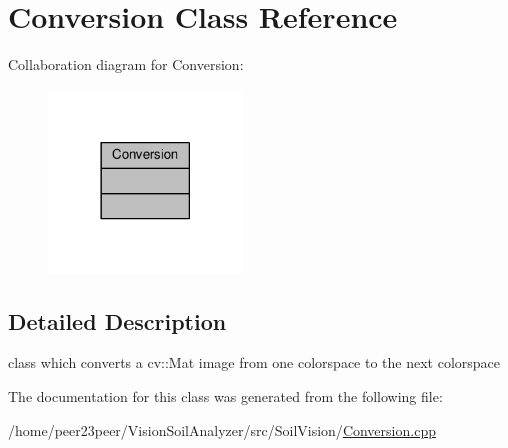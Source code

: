 \hypertarget{class_conversion}{}\section{Conversion Class Reference}
\label{class_conversion}


Collaboration diagram for Conversion\+:\nopagebreak
\begin{figure}[H]
\begin{center}
\leavevmode
\includegraphics[width=146pt]{class_conversion__coll__graph}
\end{center}
\end{figure}


\subsection{Detailed Description}
class which converts a cv\+::\+Mat image from one colorspace to the next colorspace 

The documentation for this class was generated from the following file\+:\begin{DoxyCompactItemize}
\item 
/home/peer23peer/\+Vision\+Soil\+Analyzer/src/\+Soil\+Vision/\hyperlink{_conversion_8cpp}{Conversion.\+cpp}\end{DoxyCompactItemize}
